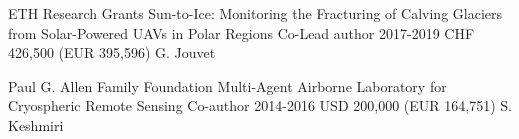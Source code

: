 \begin{cventries}
\cvgrantentry
	{ETH Research Grants} %
	{Sun-to-Ice: Monitoring the Fracturing of Calving Glaciers from Solar-Powered UAVs in Polar Regions} %
	{Co-Lead author} %
	{2017-2019} %
	{CHF 426,500 (EUR 395,596)} %
	{G. Jouvet} %
	
\cvgrantentry
	{Paul G. Allen Family Foundation} %
	{Multi-Agent Airborne Laboratory for Cryospheric Remote Sensing} %
	{Co-author} %
	{2014-2016} %
	{USD 200,000 (EUR 164,751)} %
	{S. Keshmiri} %
    
\end{cventries}


%
